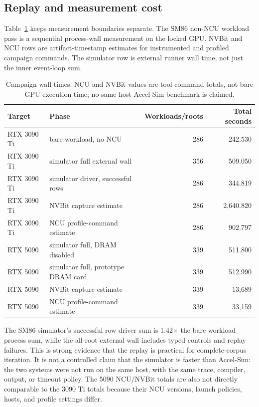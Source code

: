 \documentclass[10pt,letterpaper]{article}
\begin{document}
\subsection{Replay and measurement cost}

Table~\ref{tab:runtime} keeps measurement boundaries separate.  The SM86
non-NCU workload pass is a sequential process-wall measurement on the locked
GPU.  NVBit and NCU rows are artifact-timestamp estimates for instrumented and
profiled campaign commands.  The simulator row is external runner wall time,
not just the inner event-loop sum.

\begin{table}[t]
  \centering
  \caption{Campaign wall times.  NCU and NVBit values are tool-command totals,
  not bare GPU execution time; no same-host Accel-Sim benchmark is claimed.}
  \label{tab:runtime}
  \small
  \begin{tabular}{@{}llrr@{}}
    \toprule
    Target & Phase & Workloads/roots & Total seconds\\
    \midrule
    RTX 3090 Ti & bare workload, no NCU & 286 & 242.530\\
    RTX 3090 Ti & simulator full external wall & 356 & 509.050\\
    RTX 3090 Ti & simulator driver, successful rows & 286 & 344.819\\
    RTX 3090 Ti & NVBit capture estimate & 286 & 2,640.820\\
    RTX 3090 Ti & NCU profile-command estimate & 286 & 902.797\\
    RTX 5090 & simulator full, DRAM disabled & 339 & 511.800\\
    RTX 5090 & simulator full, prototype DRAM card & 339 & 512.990\\
    RTX 5090 & NVBit capture estimate & 339 & 13,689\\
    RTX 5090 & NCU profile-command estimate & 339 & 33,159\\
    \bottomrule
  \end{tabular}
\end{table}

The SM86 simulator's successful-row driver sum is 1.42$\times$ the bare
workload process sum, while the all-root external wall includes typed controls
and replay failures.  This is strong evidence that the replay is practical for
complete-corpus iteration.  It is not a controlled claim that the simulator is
faster than Accel-Sim: the two systems were not run on the same host, with the
same trace, compiler, output, or timeout policy.  The 5090 NCU/NVBit totals are
also not directly comparable to the 3090 Ti totals because their NCU versions,
launch policies, hosts, and profile settings differ.
\end{document}
